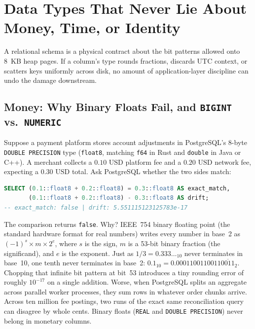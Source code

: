 \chapterline

\section{Data Types That Never Lie About Money, Time, or Identity}
\label{ch08:types}

A relational schema is a physical contract about the bit patterns allowed onto
8~KB heap pages. If a column's type rounds fractions, discards UTC context, or
scatters keys uniformly across disk, no amount of application-layer discipline can
undo the damage downstream.

\subsection{Money: Why Binary Floats Fail, and \texttt{BIGINT} vs.\ \texttt{NUMERIC}}
\label{ch08:money-types}

Suppose a payment platform stores account adjustments in PostgreSQL's 8-byte
\texttt{DOUBLE PRECISION} type (\texttt{float8}, matching \texttt{f64} in Rust and
\texttt{double} in Java or C++). A merchant collects a $0.10\text{ USD}$ platform
fee and a $0.20\text{ USD}$ network fee, expecting a $0.30\text{ USD}$ total. Ask
PostgreSQL whether the two sides match:

\begin{lstlisting}[language=SQL]
SELECT (0.1::float8 + 0.2::float8) = 0.3::float8 AS exact_match,
       (0.1::float8 + 0.2::float8) - 0.3::float8 AS drift;
-- exact_match: false | drift: 5.551115123125783e-17
\end{lstlisting}

The comparison returns \texttt{false}. Why? IEEE~754 binary floating point (the standard hardware format for real numbers) writes
every number in base~2 as $(-1)^s \times m \times 2^e$, where $s$ is the sign, $m$ is a 53-bit binary fraction (the significand), and $e$ is the exponent. Just as $1/3 = 0.333\ldots_{10}$ never terminates in base~10, one
tenth never terminates in base~2: $0.1_{10} = 0.0001100110011\overline{0011}_2$.
Chopping that infinite bit pattern at bit~53 introduces a tiny rounding error of
roughly $10^{-17}$ on a single addition. Worse, when PostgreSQL splits an
aggregate across parallel worker processes, they sum rows in whatever order chunks arrive. Across ten million
fee postings, two runs of the exact same reconciliation query can disagree by
whole cents. Binary floats (\texttt{REAL} and \texttt{DOUBLE PRECISION}) never
belong in monetary columns.

